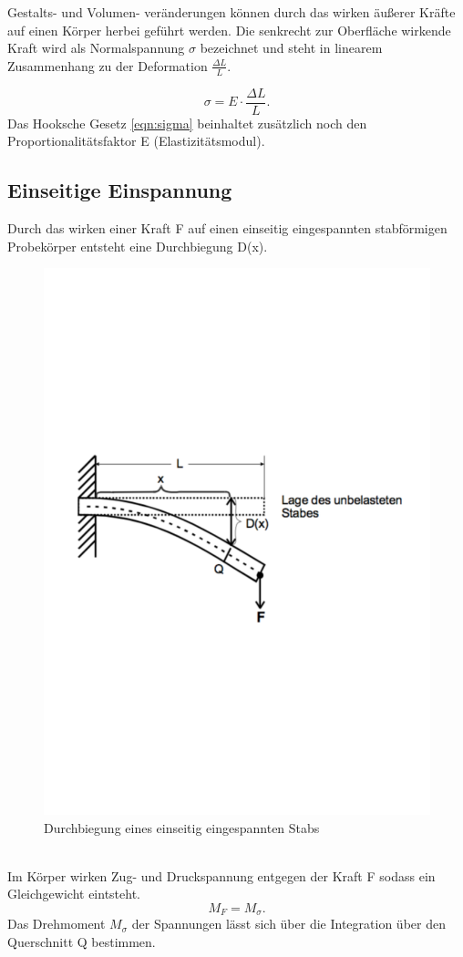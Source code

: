 Gestalts- und Volumen- veränderungen können durch das wirken äußerer Kräfte auf einen Körper herbei geführt werden. Die senkrecht zur Oberfläche wirkende Kraft wird als Normalspannung $\sigma$ bezeichnet und steht in linearem Zusammenhang zu der Deformation $\frac {\Delta L}{L}$.

  \begin{equation}
    \sigma = E \cdot \frac{\Delta L}{L}.
    \label{eqn:sigma}
  \end{equation}
Das Hooksche Gesetz \eqref{eqn:sigma} beinhaltet zusätzlich noch den Proportionalitätsfaktor E (Elastizitätsmodul).

\subsection{Einseitige Einspannung}
Durch das wirken einer Kraft F auf einen einseitig eingespannten stabförmigen Probekörper entsteht eine Durchbiegung D(x).
\begin{figure}[h!]
  \centering
  \includegraphics[width=\textwidth]{Durchbiegung.pdf}
  \caption{Durchbiegung eines einseitig eingespannten Stabs \cite{3}}
\end{figure}
\\Im Körper wirken Zug- und Druckspannung entgegen der Kraft F sodass ein Gleichgewicht eintsteht.
\begin{equation*}
  M_F=M_\sigma.
  \label{eqn:Fgl}
\end{equation*}
Das Drehmoment $M_\sigma$ der Spannungen lässt sich über die Integration über den Querschnitt Q bestimmen.

